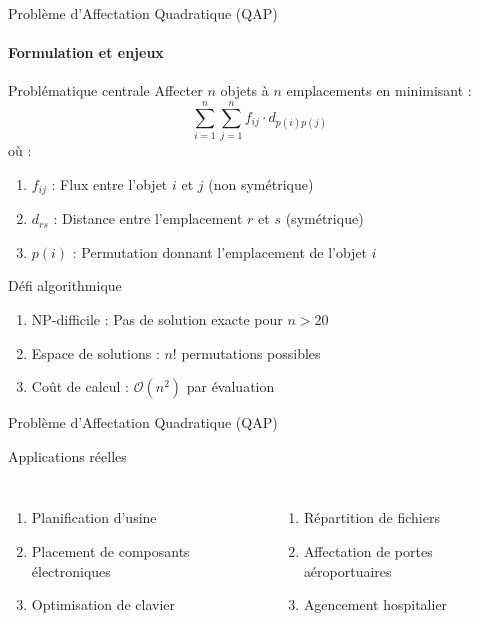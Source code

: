 \documentclass[10pt, handout]{beamer}
\begin{document}
\begin{frame}{Problème d'Affectation Quadratique (QAP)}
    \framesubtitle{Formulation et enjeux}

    \begin{block}{Problématique centrale}
        Affecter \( n \) objets à \( n \) emplacements en minimisant :
        \[
            \sum_{i=1}^n \sum_{j=1}^n f_{ij} \cdot d_{p(i)p(j)}
        \]
        où :
        \begin{enumerate}
            \item \( f_{ij} \) : Flux entre l'objet \( i \) et \( j \) (non symétrique)
            \item \( d_{rs} \) : Distance entre l'emplacement \( r \) et \( s \) (symétrique)
            \item \( p(i) \) : Permutation donnant l'emplacement de l'objet \( i \)
        \end{enumerate}
    \end{block}

    \begin{exampleblock}{Défi algorithmique}
        \begin{enumerate}
            \item NP-difficile : Pas de solution exacte pour \( n > 20 \)
            \item Espace de solutions : \( n! \) permutations possibles
            \item Coût de calcul : \( \mathcal{O}(n^2) \) par évaluation
        \end{enumerate}
    \end{exampleblock}
\end{frame}

\begin{frame}{Problème d'Affectation Quadratique (QAP)}
    \begin{alertblock}{Applications réelles}
        \begin{columns}
            \begin{enumerate}
                \item Planification d'usine
                \item Placement de composants électroniques
                \item Optimisation de clavier
            \end{enumerate}

            \begin{enumerate}
                \item Répartition de fichiers
                \item Affectation de portes aéroportuaires
                \item Agencement hospitalier
            \end{enumerate}
        \end{columns}
    \end{alertblock}
\end{frame}
\end{document}
